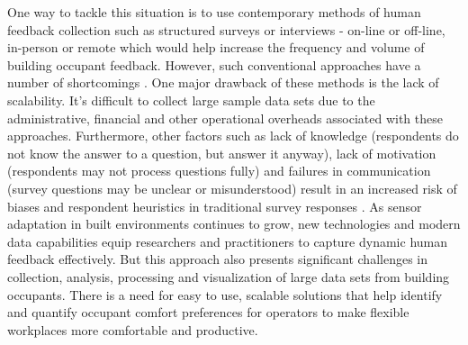 \documentclass[]{interact}
\theoremstyle{plain}%
\theoremstyle{definition}
\theoremstyle{remark}
\begin{document}

One way to tackle this situation is to use contemporary methods of human feedback collection such as structured surveys or interviews - on-line or off-line, in-person or remote which would help increase the frequency and volume of building occupant feedback. However, such conventional approaches have a number of shortcomings \citep{oecd}. One major drawback of these methods is the lack of scalability. It’s difficult to collect large sample data sets due to the administrative, financial and other operational overheads associated with these approaches. Furthermore, other factors such as lack of knowledge (respondents do not know the answer to a question, but answer it anyway), lack of motivation (respondents may not process questions fully) and failures in communication (survey questions may be unclear or misunderstood) result in an increased risk of biases and respondent heuristics in traditional survey responses \citep{bradburn2004asking}. As sensor adaptation in built environments continues to grow, new technologies and modern data capabilities equip researchers and practitioners to capture dynamic human feedback effectively. But this approach also presents significant challenges in collection, analysis, processing and visualization of large data sets from building occupants. There is a need for easy to use, scalable solutions that help identify and quantify occupant comfort preferences for operators to make flexible workplaces more comfortable and productive.
\end{document}
